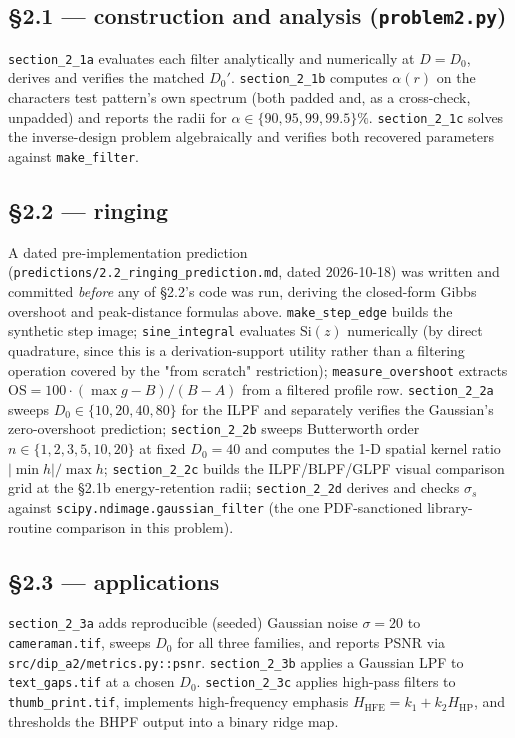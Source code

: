 \documentclass[11pt]{article}
\begin{document}
\subsection{\S2.1 --- construction and analysis (\texttt{problem2.py})}

\texttt{section\_2\_1a} evaluates each filter analytically and numerically at $D=D_0$, derives and
verifies the matched $D_0'$. \texttt{section\_2\_1b} computes $\alpha(r)$ on the characters test
pattern's own spectrum (both padded and, as a cross-check, unpadded) and reports the radii for
$\alpha\in\{90,95,99,99.5\}\%$. \texttt{section\_2\_1c} solves the inverse-design problem
algebraically and verifies both recovered parameters against \texttt{make\_filter}.

\subsection{\S2.2 --- ringing}

A dated pre-implementation prediction (\texttt{predictions/2.2\_ringing\_prediction.md}, dated
2026-10-18) was written and committed \emph{before} any of \S2.2's code was run, deriving the
closed-form Gibbs overshoot and peak-distance formulas above. \texttt{make\_step\_edge} builds the
synthetic step image; \texttt{sine\_integral} evaluates $\mathrm{Si}(z)$ numerically (by direct
quadrature, since this is a derivation-support utility rather than a filtering operation covered
by the "from scratch" restriction); \texttt{measure\_overshoot} extracts $\text{OS} = 100\cdot
(\max g - B)/(B-A)$ from a filtered profile row. \texttt{section\_2\_2a} sweeps $D_0\in
\{10,20,40,80\}$ for the ILPF and separately verifies the Gaussian's zero-overshoot prediction;
\texttt{section\_2\_2b} sweeps Butterworth order $n\in\{1,2,3,5,10,20\}$ at fixed $D_0=40$ and
computes the 1-D spatial kernel ratio $|\min h|/\max h$; \texttt{section\_2\_2c} builds the
ILPF/BLPF/GLPF visual comparison grid at the §2.1b energy-retention radii; \texttt{section\_2\_2d}
derives and checks $\sigma_s$ against \texttt{scipy.ndimage.gaussian\_filter} (the one
PDF-sanctioned library-routine comparison in this problem).

\subsection{\S2.3 --- applications}

\texttt{section\_2\_3a} adds reproducible (seeded) Gaussian noise $\sigma=20$ to
\texttt{cameraman.tif}, sweeps $D_0$ for all three families, and reports PSNR via
\texttt{src/dip\_a2/metrics.py::psnr}. \texttt{section\_2\_3b} applies a Gaussian LPF to
\texttt{text\_gaps.tif} at a chosen $D_0$. \texttt{section\_2\_3c} applies high-pass filters to
\texttt{thumb\_print.tif}, implements high-frequency emphasis $H_{\text{HFE}}=k_1+k_2H_{\text{HP}}$,
and thresholds the BHPF output into a binary ridge map.
\end{document}
